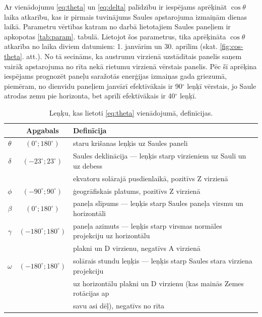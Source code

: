 Ar vienādojumu \ref{eq:theta} un \ref{eq:delta} palīdzību ir iespējams aprēķināt $\cos{\theta}$ laika atkarību, kas ir pirmais tuvinājums Saules apstarojuma izmaiņām dienas laikā.
Parametru vērtības katram no darbā lietotajiem Saules paneļiem ir apkopotas \ref{tab:param}. tabulā.
Lietojot šos parametrus, tika aprēķināta $\cos{\theta}$ atkarība no laika diviem datumiem: 1. janvārim un 30. aprīlim (skat. \ref{fig:cos-theta}. att.). No tā secināms, ka austrumu virzienā uzstādītais panelis saņem vairāk apstarojuma no rīta nekā rietumu virzienā vērstais panelis. Pēc šī aprēķina iespējams prognozēt paneļu saražotās enerģijas izmaiņas gada griezumā, piemēram, no dienvidu paneļiem janvārī efektīvākais ir 90$^\circ$ leņķī vērstais, jo Saule atrodas zemu pie horizonta, bet aprīlī efektīvākais ir 40$^\circ$ leņķī.

\begin{table}[h!]
	\caption{Leņķu, kas lietoti \ref{eq:theta} vienādojumā, definīcijas.}
	\begin{center}
		\begin{tabular}{|c|c|l|}
			\hline
			         &         Apgabals         & Definīcija                                                                 \\ \hline
			$\theta$ &  $(0^\circ;180^\circ)$   & staru krišanas leņķis uz Saules paneli                                     \\ \hline
			$\delta$ &  $(-23^\circ;23^\circ)$  & Saules deklinācija --- leņķis starp virzieniem uz Sauli un uz debess       \\
			         &                          & ekvatoru solārajā pusdienlaikā, pozitīvs Z virzienā                        \\ \hline
			 $\phi$  &  $(-90^\circ;90^\circ)$  & ģeogrāfiskais platums, pozitīvs Z virzienā                                 \\ \hline
			$\beta$  &  $(0^\circ;180^\circ)$   & paneļa slīpums --- leņķis starp Saules paneļa virsmu un horizontāli        \\ \hline
			$\gamma$ & $(-180^\circ;180^\circ)$ & paneļa azimuts --- leņķis starp virsmas normāles projekciju uz horizontālu \\
			         &                          & plakni un D virzienu, negatīvs A virzienā                                  \\ \hline
			$\omega$ & $(-180^\circ;180^\circ)$ & solārais stundu leņķis --- leņķis starp Saules stara virziena projekciju   \\
			         &                          & uz horizontālu plakni un D virzienu (kas mainās Zemes rotācijas ap         \\
			         &                          & savu asi dēļ), negatīvs no rīta                                            \\ \hline
		\end{tabular}
	\end{center}
	\label{tab:theta}
\end{table}

